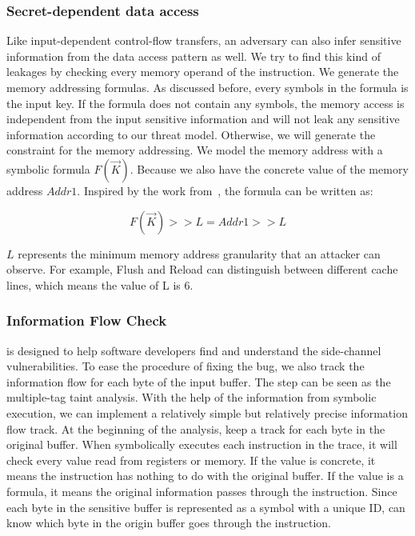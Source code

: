 \subsubsection{Secret-dependent data access}
Like input-dependent control-flow transfers, an adversary can also infer sensitive information from the data access pattern as well. We try to find this kind of leakages by checking every memory operand of the instruction. We generate the memory addressing
formulas. As discussed before, every symbols in the formula is the input key. If the formula does not contain any symbols, the memory access is independent
from the input sensitive information and will not leak any sensitive information according to our threat model. Otherwise, we will generate the constraint for
the memory addressing. We model the memory address with a symbolic formula $F(\vec{K})$. Because we also have the concrete value of the memory address $Addr1$.
Inspired by the work from~\cite{203878}, the formula can be written as:

$$F(\vec{K}) >> L = Addr1 >> L$$

$L$ represents the minimum memory address granularity that an attacker can observe. For example, Flush and Reload can distinguish between different cache lines, which means the value of L is 6.

\subsubsection{Information Flow Check}
\tool{} is designed to help software developers find and understand the side-channel vulnerabilities. To ease the procedure of fixing the bug, we also track the information flow for each byte of the input
buffer.
The step can be seen as the multiple-tag taint analysis. With the help of the information from symbolic execution, we can implement a relatively simple but relatively precise information flow track.
At the beginning of the analysis, \tool{} keep a track for each byte in
the original buffer. When \tool{} symbolically executes each instruction in the trace, it will check every value read from registers or memory. If the value is concrete, it means the instruction has nothing to do with the original buffer.
If the value is a formula, it means the original information passes through the instruction. Since each byte in the sensitive buffer is represented as a symbol with a unique ID, \tool{} can know which byte in the origin buffer goes through the instruction.

